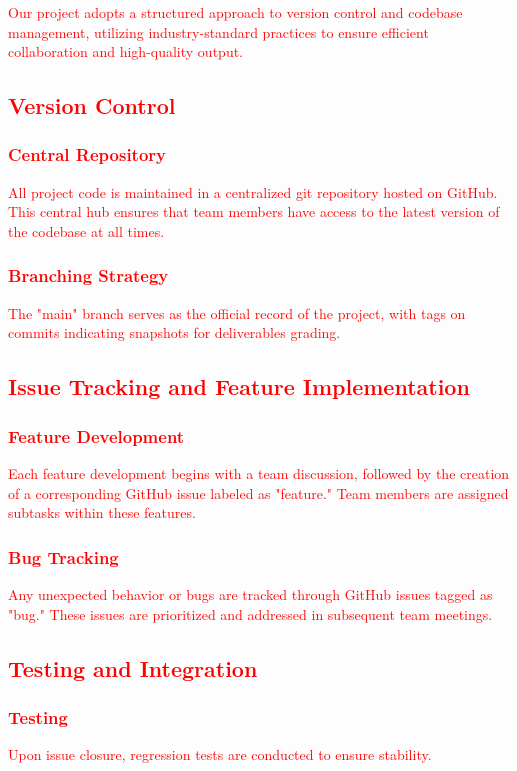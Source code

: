 \documentclass{article}
\begin{document}
\textcolor{red}{Our project adopts a structured approach to version control 
and codebase management, utilizing industry-standard practices to ensure 
efficient collaboration and high-quality output.}

\subsection{\textcolor{red}{Version Control}}
\subsubsection{\textcolor{red}{Central Repository}}
  \textcolor{red}{All project code is maintained in a centralized git repository 
  hosted on GitHub. This central hub ensures that team members have access to the 
  latest version of the codebase at all times.}
\subsubsection{\textcolor{red}{Branching Strategy}}
  \textcolor{red}{The "main" branch serves as the official record of the project, 
  with tags on commits indicating snapshots for deliverables grading.}

\subsection{\textcolor{red}{Issue Tracking and Feature Implementation}}
\subsubsection{\textcolor{red}{Feature Development}}
  \textcolor{red}{Each feature development begins with a team discussion, 
  followed by the creation of a corresponding GitHub issue labeled as "feature." 
  Team members are assigned subtasks within these features.}
\subsubsection{\textcolor{red}{Bug Tracking}}
  \textcolor{red}{Any unexpected behavior or bugs are tracked through GitHub issues 
  tagged as "bug." These issues are prioritized and addressed in subsequent team 
  meetings.}

\subsection{\textcolor{red}{Testing and Integration}}
\subsubsection{\textcolor{red}{Testing}}
  \textcolor{red}{Upon issue closure, regression tests are conducted to ensure 
  stability.}
\end{document}
